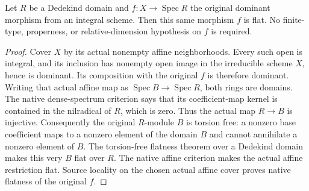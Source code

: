 \begin{theorem}
\label{thm:proper-flattening-dedekind-native-flat}
\leanok
Let $R$ be a Dedekind domain and $f:X\to\operatorname{Spec}R$ the
original dominant morphism from an integral scheme.  Then this same
morphism $f$ is flat.  No finite-type, properness, or relative-dimension
hypothesis on $f$ is required.
\end{theorem}
\begin{proof}
Cover $X$ by its actual nonempty affine neighborhoods.  Every such open
is integral, and its inclusion has nonempty open image in the irreducible
scheme $X$, hence is dominant.  Its composition with the original $f$
is therefore dominant.  Writing that actual affine map as
$\operatorname{Spec}B\to\operatorname{Spec}R$, both rings are domains.
The native dense-spectrum criterion says that its coefficient-map kernel
is contained in the nilradical of $R$, which is zero.  Thus the actual
map $R\to B$ is injective.  Consequently the original $R$-module $B$
is torsion free: a nonzero base coefficient maps to a nonzero element
of the domain $B$ and cannot annihilate a nonzero element of $B$.
The torsion-free flatness theorem over a Dedekind domain makes this very
$B$ flat over $R$.  The native affine criterion makes the actual affine
restriction flat.  Source locality on the chosen actual affine cover
proves native flatness of the original $f$.
\end{proof}

\endgroup

\begingroup

